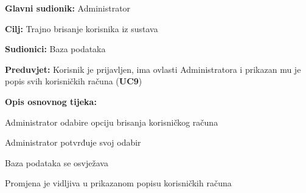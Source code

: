 	
	\noindent {}
	\begin{packed_item}
		
		\item \textbf{Glavni sudionik:} Administrator
		\item  \textbf{Cilj:} Trajno brisanje korisnika iz sustava
		\item  \textbf{Sudionici:} Baza podataka
		\item  \textbf{Preduvjet:} Korisnik je prijavljen, ima ovlasti Administratora i prikazan mu je popis svih korisničkih računa (\textbf{UC9})
		\item  \textbf{Opis osnovnog tijeka:}
		
		\item[] \begin{packed_enum}
			
			\item Administrator odabire opciju brisanja korisničkog računa 
			\item Administrator potvrđuje svoj odabir
			\item Baza podataka se osvježava
			\item Promjena je vidljiva u prikazanom popisu korisničkih računa
			
		\end{packed_enum}
		
	\end{packed_item}
	
	
	\newpage
	
